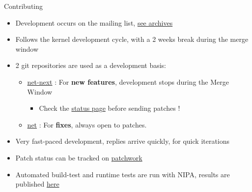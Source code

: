 \begin{frame}{Contributing}
	\begin{itemize}
		\item Development occurs on the  mailing list, \href{https://lore.kernel.org/netdev/}{see archives}
		\item Follows the kernel development cycle, with a 2 weeks break during the merge window
		\item 2 git repositories are used as a development basis:
			\begin{itemize}
				\item \href{https://git.kernel.org/pub/scm/linux/kernel/git/netdev/net-next.git/}{net-next} : For \textbf{new features}, development stops during the Merge Window
					\begin{itemize}
						\item Check the \href{https://patchwork.hopto.org/net-next.html}{status page} before sending patches !
					\end{itemize}
				\item \href{https://git.kernel.org/pub/scm/linux/kernel/git/netdev/net.git/}{net} : For \textbf{fixes}, always open to patches.
			\end{itemize}
		\item Very fast-paced development, replies arrive quickly, for quick iterations
		\item Patch status can be tracked on \href{https://patchwork.kernel.org/project/netdevbpf/list/}{patchwork}
		\item Automated build-test and runtime tests are run with NIPA, results are published \href{https://netdev.bots.linux.dev/status.html}{here}
	\end{itemize}
\end{frame}

